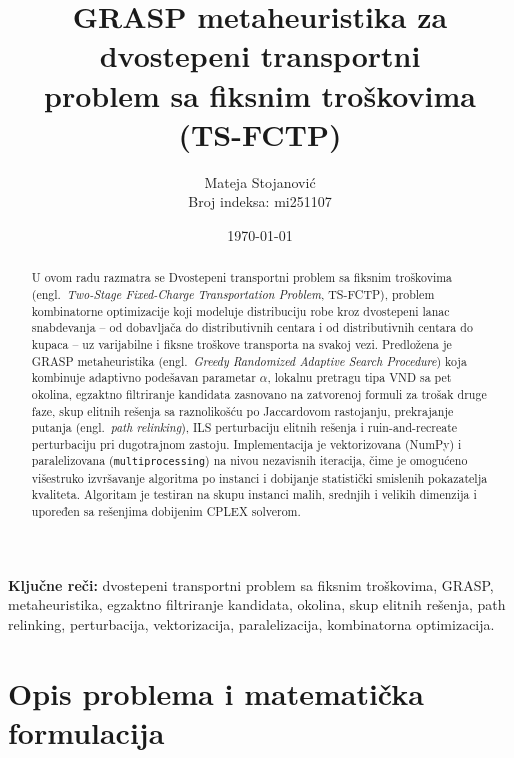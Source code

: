 \documentclass[12pt,a4paper]{article}
\title{\textbf{GRASP metaheuristika za dvostepeni transportni\\
problem sa fiksnim troškovima (TS-FCTP)}}
\author{Mateja Stojanović \\ Broj indeksa: mi251107}
\date{\today}
\begin{document}
\maketitle
\thispagestyle{empty}

\begin{abstract}
U ovom radu razmatra se Dvostepeni transportni problem sa fiksnim troškovima
(engl.\ \textit{Two-Stage Fixed-Charge Transportation Problem}, TS-FCTP),
problem kombinatorne optimizacije koji modeluje distribuciju robe kroz
dvostepeni lanac snabdevanja -- od dobavljača do distributivnih centara i od
distributivnih centara do kupaca -- uz varijabilne i fiksne troškove transporta
na svakoj vezi. Predložena je GRASP metaheuristika (engl.\ \textit{Greedy
Randomized Adaptive Search Procedure}) koja kombinuje adaptivno podešavan
parametar $\alpha$, lokalnu pretragu tipa VND sa pet okolina, egzaktno
filtriranje kandidata zasnovano na zatvorenoj formuli za trošak druge faze,
skup elitnih rešenja sa raznolikošću po Jaccardovom rastojanju, prekrajanje
putanja (engl.\ \textit{path relinking}), ILS perturbaciju elitnih rešenja
i ruin-and-recreate perturbaciju pri dugotrajnom zastoju. Implementacija je vektorizovana
(NumPy) i paralelizovana (\texttt{multiprocessing}) na nivou nezavisnih
iteracija, čime je omogućeno višestruko izvršavanje algoritma po instanci i
dobijanje statistički smislenih pokazatelja kvaliteta. Algoritam je testiran
na skupu instanci malih, srednjih i velikih dimenzija i upoređen sa rešenjima
dobijenim CPLEX solverom.
\end{abstract}
\vspace{30pt}
\textbf{Ključne reči:} dvostepeni transportni problem sa fiksnim troškovima,
GRASP, metaheuristika, egzaktno filtriranje kandidata, okolina, skup elitnih
rešenja, path relinking, perturbacija, vektorizacija, paralelizacija,
kombinatorna optimizacija.

\section{Opis problema i matematička formulacija}
\end{document}
